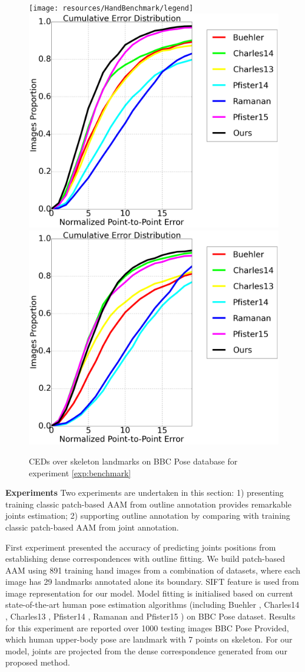 \begin{figure}[b!]
    \centering
    \texttt{[image: resources/HandBenchmark/legend]}
    \\
    \includegraphics[width=0.48\columnwidth]{resources/HandBenchmark/wrist}
    \includegraphics[width=0.48\columnwidth]{resources/HandBenchmark/elbow}
    \caption{CEDs over skeleton landmarks on BBC Pose database for experiment \ref{exp:benchmark}}
    \label{fig:hand_benchmark}
\end{figure}

\textbf{Experiments} Two experiments are undertaken in this section: 1) presenting training classic patch-based AAM from outline annotation provides remarkable joints estimation; 2) supporting outline annotation by comparing with training classic patch-based AAM from joint annotation.

First experiment presented the accuracy of predicting joints positions from establishing dense correspondences with outline fitting. We build patch-based AAM using 891 training hand images from a combination of datasets, where each image has 29 landmarks annotated alone its boundary. SIFT \cite{PoseletsICCV09} feature is used from image representation for our model. Model fitting is initialised based on current state-of-the-art human pose estimation algorithms (including Buehler \cite{buehler2011upper}, Charles14 \cite{charles2014upper}, Charles13 \cite{charles2013domain}, Pfister14 \cite{pfister2015deep}, Ramanan \cite{yang2013articulated} and Pfister15 \cite{pfister2015flowing}) on BBC Pose \cite{pfister2015flowing} dataset. Results for this experiment are reported over 1000 testing images BBC Pose Provided, which human upper-body pose are landmark with 7 points on skeleton. For our model, joints are projected from the dense correspondence generated from our proposed method.

